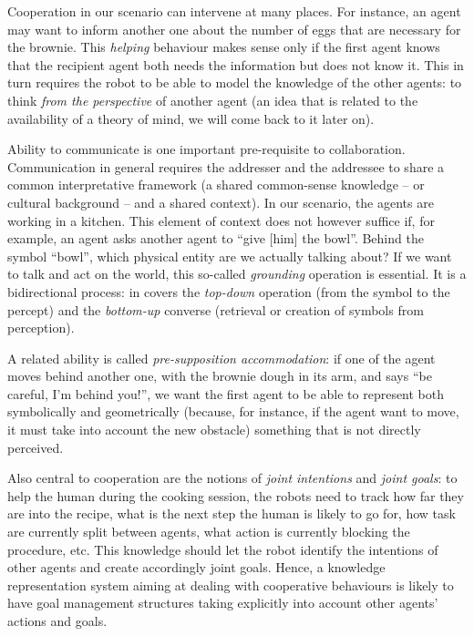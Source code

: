 Cooperation in our scenario can intervene at many places. For instance, an
agent may want to inform another one about the number of eggs that are
necessary for the brownie. This \emph{helping} behaviour makes sense only if
the first agent knows that the recipient agent both needs the information but
does not know it. This in turn requires the robot to be able to model the
knowledge of the other agents: to think \emph{from the perspective} of another
agent (an idea that is related to the availability of a theory of mind, we will
come back to it later on).

Ability to communicate is one important pre-requisite to collaboration.
Communication in general requires the addresser and the addressee to share a
common interpretative framework (a shared common-sense knowledge -- or cultural
background -- and a shared context). In our scenario, the agents are working in
a kitchen. This element of context does not however suffice if, for example, an
agent asks another agent to ``give {[him]} the bowl''. Behind the symbol
``bowl'', which physical entity are we actually talking about? If we want to
talk and act on the world, this so-called \emph{grounding} operation is
essential. It is a bidirectional process: in covers the {\it top-down}
operation (from the symbol to the percept) and the {\it bottom-up} converse
(retrieval or creation of symbols from perception).

A related ability is called \emph{pre-supposition accommodation}: if one of the
agent moves behind another one, with the brownie dough in its arm, and says
``be careful, I'm behind you!'', we want the first agent to be able to
represent both symbolically and geometrically (because, for instance, if the
agent want to move, it must take into account the new obstacle) something that
is not directly perceived.

Also central to cooperation are the notions of \emph{joint intentions} and
\emph{joint goals}: to help the human during the cooking session, the robots
need to track how far they are into the recipe, what is the next step the human
is likely to go for, how task are currently split between agents, what action
is currently blocking the procedure, etc. This knowledge should let the robot
identify the intentions of other agents and create accordingly joint goals.
Hence, a knowledge representation system aiming at dealing with cooperative
behaviours is likely to have goal management structures taking explicitly into
account other agents' actions and goals.

